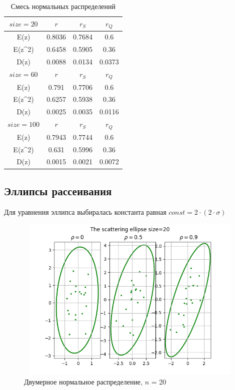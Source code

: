 \documentclass[a4paper]{article}
\begin{document}
	
	\begin{table}[H]
		\centering
		\begin{tabular}{| c | c | c | c |}
			
			\hline
			$size = 20$ & $r$      & $r_{S}$ & $r_{Q}$ \\
			\hline
			E(z)      & 0.8036 & 0.7684 & 0.6   \\
            E(z\^{}2)    & 0.6458 & 0.5905 & 0.36  \\
            D(z)      & 0.0088 & 0.0134 & 0.0373 \\
			\hline
			$size = 60$ & $r$      & $r_{S}$ & $r_{Q}$ \\
			\hline
			E(z)      & 0.791 & 0.7706 & 0.6   \\
            E(z\^{}2)    & 0.6257 & 0.5938 & 0.36  \\
            D(z)      & 0.0025 & 0.0035 & 0.0116 \\
			\hline
			$size = 100$ & $r$      & $r_{S}$ & $r_{Q}$ \\
			\hline
			E(z)       & 0.7943 & 0.7744 & 0.6   \\
            E(z\^{}2)     & 0.631 & 0.5996 & 0.36  \\
            D(z)       & 0.0015 & 0.0021 & 0.0072 \\
			\hline
			
		\end{tabular}{}
		\caption{Смесь нормальных распределений}
		\label{tab:mix_normal}
	\end{table}
\subsection{Эллипсы рассеивания}
\noindent Для уравнения эллипса выбиралась константа равная $const = 2 \cdot (2 \cdot \sigma)$
	
	\begin{figure}[H]
		\centering
		\includegraphics[width = 13cm, height = 8cm]{./lab2_1/pictures/the scattering ellipse size=20.png}
		\caption{Двумерное нормальное распределение, $n$ = 20}
		\label{fig:n20}
	\end{figure}
	
\end{document}

